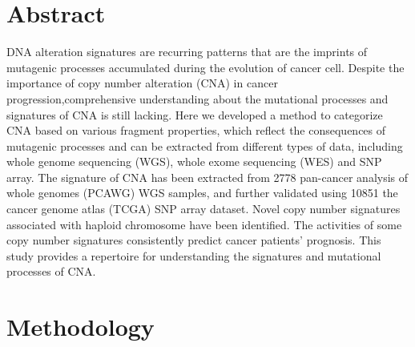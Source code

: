 \documentclass[
]{article}
\author{true \and true \and true \and true \and true \and true \and true \and true \and true}
\date{}
\begin{document}
\hypertarget{abstract}{%
\section{Abstract}\label{abstract}}

DNA alteration signatures are recurring patterns that are the imprints
of mutagenic processes accumulated during the evolution of cancer cell.
Despite the importance of copy number alteration (CNA) in cancer
progression,comprehensive understanding about the mutational processes
and signatures of CNA is still lacking. Here we developed a method to
categorize CNA based on various fragment properties, which reflect the
consequences of mutagenic processes and can be extracted from different
types of data, including whole genome sequencing (WGS), whole exome
sequencing (WES) and SNP array. The signature of CNA has been extracted
from 2778 pan-cancer analysis of whole genomes (PCAWG) WGS samples, and
further validated using 10851 the cancer genome atlas (TCGA) SNP array
dataset. Novel copy number signatures associated with haploid chromosome
have been identified. The activities of some copy number signatures
consistently predict cancer patients' prognosis. This study provides a
repertoire for understanding the signatures and mutational processes of
CNA.

\hypertarget{methodology}{%
\section{Methodology}\label{methodology}}
\end{document}
